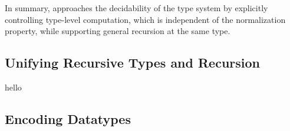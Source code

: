 In summary, \name approaches the decidability of the type system by explicitly controlling type-level computation, which is independent of the normalization property, while supporting general recursion at the same type.

\subsection{Unifying Recursive Types and Recursion}

 hello

\subsection{Encoding Datatypes}


